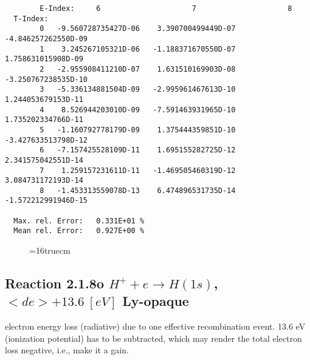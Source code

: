 \documentclass[12pt,dvipdfmx]{article}
\begin{document}
\begin{small}
\begin{verbatim}
        E-Index:     6                     7                     8
  T-Index:
        0   -9.560728735427D-06    3.390700499449D-07   -4.846257262550D-09
        1    3.245267105321D-06   -1.188371670550D-07    1.758631015908D-09
        2   -2.955908411210D-07    1.631510169903D-08   -3.250767238535D-10
        3   -5.336134881504D-09   -2.995961467613D-10    1.244053679153D-11
        4    8.526944203010D-09   -7.591463931965D-10    1.735202334766D-11
        5   -1.160792778179D-09    1.375444359851D-10   -3.427633513798D-12
        6   -7.157425528109D-11    1.695155282725D-12    2.341575042551D-14
        7    1.259157231611D-11   -1.469505460319D-12    3.084731172193D-14
        8   -1.453313559078D-13    6.474896531735D-14   -1.572212991946D-15

  Max. rel. Error:   0.331E+01 %
  Mean rel. Error:   0.927E+00 %

\end{verbatim}\end{small}
\begin{figure} \label{2.1.8lr2}
\epsfxsize=16truecm
\end{figure}
\newpage




\subsection{
  Reaction 2.1.8o $H^+ + e \rightarrow H(1s) $, \ $ <de> + 13.6 \ [eV] $
  Ly-opaque
}

  electron energy loss (radiative) due to one effective recombination event.
  13.6 eV (ionization potential) has to be
  subtracted, which may render the total electron loss negative, i.e., make it a gain.
\end{document}

